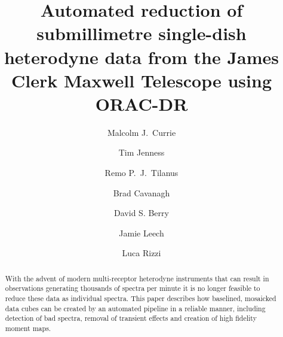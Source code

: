 \documentclass[final,authoryear,5p,times,twocolumn]{elsarticle}
\begin{document}
\begin{frontmatter}



\title{Automated reduction of submillimetre single-dish heterodyne
  data from the James Clerk Maxwell Telescope using ORAC-DR}


\author[jac]{Malcolm J.\ Currie}
\author[jac,cornell]{Tim Jenness}
\author[jac]{Remo P.\ J.\ Tilanus}
\author[jac]{Brad Cavanagh}
\author[jac]{David S. Berry}
\author[jac]{Jamie Leech}
\author[jac]{Luca Rizzi}


\address[jac]{Joint Astronomy Centre, 660 N.\ A`oh\=ok\=u Place, Hilo, HI
  96720, USA}
\address[cornell]{Department of Astronomy, Cornell University, Ithaca,
  NY 14853, USA}

\begin{abstract}

With the advent of modern multi-receptor heterodyne instruments that
can result in observations generating thousands of spectra per minute it is
no longer feasible to reduce these data as individual spectra. This
paper describes how baselined, mosaicked data cubes can be created by
an automated pipeline in a reliable manner, including detection of bad
spectra, removal of transient effects and creation of high fidelity
moment maps.


\end{abstract}
\end{frontmatter}
\end{document}
